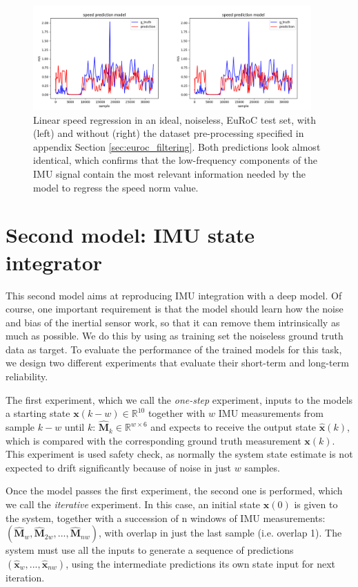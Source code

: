 \begin{figure}[h]
   \centering
   \includegraphics[width=0.95\textwidth]{thesis_template/img/speed_prediction_ideal_filtered_vs_unfiltered.jpg}
   \caption{
   Linear speed regression in an ideal, noiseless, EuRoC test set, with (left) and without (right) the dataset pre-processing specified in appendix Section \ref{sec:euroc_filtering}.
   Both predictions look almost identical, which confirms that the low-frequency components of the IMU signal contain the most relevant information needed by the model to regress the speed norm value.}
   \label{fig:speed_prediction_filtered_vs_unfiltered_ideal}
\end{figure}

\section{Second model: IMU state integrator}

This second model aims at reproducing IMU integration with a deep model. 
Of course, one important requirement is that the model should learn how the noise and bias of the inertial sensor work, so that it can remove them intrinsically as much as possible.
We do this by using as training set the noiseless ground truth data as target.
To evaluate the performance of the trained models for this task, we design two different experiments that evaluate their short-term and long-term reliability. 

The first experiment, which we call the \emph{one-step} experiment, inputs to the models a starting state $\mathbf{x}(k-w)\in\mathbb{R}^{10}$ together with $w$ IMU measurements from sample $k-w$ until $k$: $\mathbf{\hat{M}}_k\in\mathbb{R}^{w\times6}$ and expects to receive the output state $\mathbf{\hat{x}}(k)$, which is compared with the corresponding ground truth measurement $\mathbf{x}(k)$.
This experiment is used safety check, as normally the system state estimate is not expected to drift significantly because of noise in just $w$ samples.

Once the model passes the first experiment, the second one is performed, which we call the \emph{iterative} experiment.
In this case, an initial state $\mathbf{x}(0)$ is given to the system, together with a succession of n windows of IMU measurements: $\left(\mathbf{\hat{M}}_w,\mathbf{\hat{M}}_{2w},...,\mathbf{\hat{M}}_{nw}\right)$, with overlap in just the last sample (i.e. overlap 1). 
The system must use all the inputs to generate a sequence of predictions $\left(\mathbf{\hat{x}}_w, ..., \mathbf{\hat{x}}_{nw}\right)$, using the intermediate predictions its own state input for next iteration.


